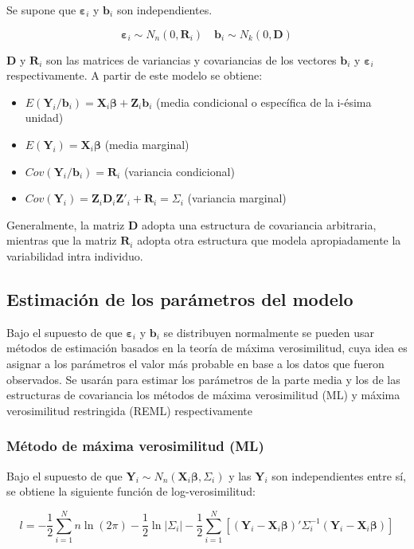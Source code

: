 \documentclass[spanish]{article}
\numberwithin{figure}{subsection}
\numberwithin{equation}{subsection}
\numberwithin{table}{subsection}
\begin{document}
Se supone que $\bm{\varepsilon}_i$ y $\bm{b}_i$ son independientes.

\[ \bm{\varepsilon}_i \sim N_{n}(0, \bm{R}_i) \quad \bm{b}_i \sim N_k(0, \bm{D}) \]

$\bm{D}$ y $\bm{R}_i$ son las matrices de variancias y covariancias de los
vectores $\bm{b}_i$ y $\bm{\varepsilon}_i$ respectivamente. A partir de este
modelo se obtiene:

\begin{itemize}
	\item $E(\bm{Y}_i/\bm{b}_i) = \bm{X}_i\bm{\beta} + \bm{Z}_i\bm{b}_i$ (media condicional o específica de
	la i-ésima unidad)
	\item $E(\bm{Y}_i) = \bm{X}_i\bm{\beta}$ (media marginal)
	\item $Cov(\bm{Y}_i/\bm{b}_i) = \bm{R}_i$ (variancia condicional)
	\item $Cov(\bm{Y}_i) = \bm{Z}_i \bm{D}_i \bm{Z}'_i + \bm{R}_i = \bm{\varSigma}_i$ (variancia marginal)
\end{itemize}

Generalmente, la matriz $\bm{D}$ adopta una estructura de covariancia
arbitraria, mientras que la matriz $\bm{R}_i$ adopta otra estructura que modela
apropiadamente la variabilidad intra individuo.

\subsection{Estimación de los parámetros del modelo}

Bajo el supuesto de que $\bm{\varepsilon}_i$ y $\bm{b}_i$ se distribuyen normalmente se
pueden usar métodos de estimación basados en la teoría de máxima verosimilitud,
cuya idea es asignar a los parámetros el valor más probable en base a los datos
que fueron observados. Se usarán para estimar los parámetros de la parte media
y los de las estructuras de covariancia los métodos de máxima verosimilitud
(ML) y máxima verosimilitud restringida (REML) respectivamente

\subsubsection{Método de máxima verosimilitud (ML)}

Bajo el supuesto de que $\bm{Y}_i \sim N_n(\bm{X}_i \bm{\beta},
\bm{\varSigma}_i)$ y las $\bm{Y}_i$
son independientes entre sí, se obtiene la siguiente función de
log-verosimilitud:

\begin{equation}
\label{ML}
	l = -\frac{1}{2} \sum_{i=1}^{N}n \ln(2\pi) - \frac{1}{2}\ln|\bm{\varSigma}_i| -
	\frac{1}{2} \sum_{i=1}^{N} [(\bm{Y}_i - \bm{X}_i\bm{\beta})'
	\bm{\varSigma}_i^{-1} (\bm{Y}_i - \bm{X}_i\bm{\beta})]
\end{equation}
\end{document}
